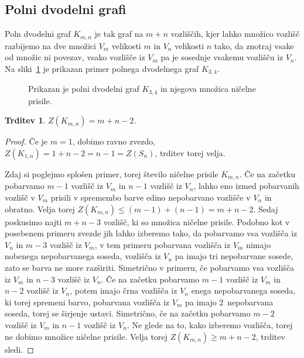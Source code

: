 \documentclass[12pt,a4paper,twoside]{article}
\theoremstyle{definition} %
\theoremstyle{plain} %
\newtheorem{trditev}[definicija]{Trditev}
\numberwithin{equation}{section}  %
\begin{document}
\subsection{Polni dvodelni grafi}
Poln dvodelni graf $K_{m,n}$ je tak graf na $m+n$ vozliščih, kjer lahko množico vozlišč razbijemo na dve množici $V_m$ velikosti $m$ in $V_n$ velikosti $n$ tako, da znotraj vsake od množic ni povezav, vsako vozlišče iz $V_m$ pa je sosednje vsakemu vozlišču iz $V_n$. Na sliki~\ref{fig:polni-dvodelni-graf} je prikazan primer polnega dvodelnega graf $K_{3,4}$.
\begin{figure}[h]
    \centering
    \caption{Prikazan je polni dvodelni graf $K_{3,4}$ in njegova množica ničelne prisile.}
    \label{fig:polni-dvodelni-graf}
\end{figure}
\begin{trditev}
    \label{trd:polni-dvodelni-graf}
    $Z(K_{m,n}) = m + n - 2$.
\end{trditev}
\begin{proof}
    Če je $m=1$, dobimo ravno zvezdo, $Z(K_{1,n}) = 1 + n - 2 = n - 1 = Z(S_n)$, trditev torej velja.
    
    Zdaj si poglejmo splošen primer, torej število ničelne prisile $K_{m,n}$. Če na začetku pobarvamo $m-1$ vozlišč iz $V_m$ in $n-1$ vozlišč iz $V_n$, lahko eno izmed pobarvanih vozlišč v $V_m$ prisili v spremembo barve edino nepobarvano vozlišče v $V_n$ in obratno. Velja torej $Z(K_{m,n}) \leq (m - 1) + (n - 1) = m + n -2$. Sedaj poskusimo najti $m + n - 3$ vozlišč, ki so množica ničelne prisile. Podobno kot v posebenem primeru zvezde jih lahko izberemo tako, da pobarvamo vsa vozlišča iz $V_n$ in $m-3$ vozlišč iz $V_m$, v tem primeru pobarvana vozlišča iz $V_m$ nimajo nobenega nepobarvanega soseda, vozlišča iz $V_n$ pa imajo tri nepobarvane sosede, zato se barva ne more razširiti. Simetrično v primeru, če pobarvamo vsa vozlišča iz $V_m$ in $n-3$ vozlišč iz $V_n$. Če na začetku pobarvamo $m-1$ vozlišč iz $V_m$ in $n-2$ vozlišč iz $V_n$, potem imajo črna vozlišča iz $V_n$ enega nepobarvanega soseda, ki torej spremeni barvo, pobarvana vozlišča iz $V_m$ pa imajo 2~nepobarvana soseda, torej se širjenje ustavi. Simetrično, če na začetku pobarvamo $m-2$ vozlišč iz $V_m$ in $n-1$ vozlišč iz $V_n$. Ne glede na to, kako izberemo vozlišča, torej ne dobimo množice ničelne prisile. Velja torej $Z(K_{m,n}) \geq m + n - 2$, trditev sledi.
\end{proof}
\end{document}
